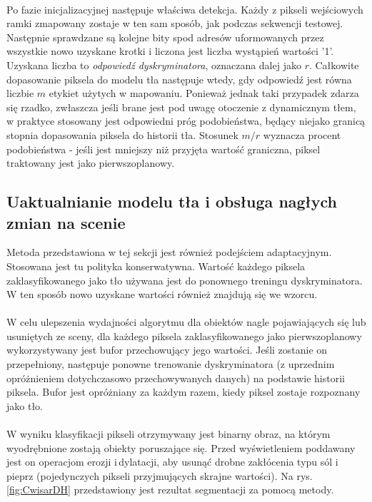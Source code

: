\paragraph{}
Po fazie inicjalizacyjnej następuje właściwa detekcja. Każdy z pikseli wejściowych ramki zmapowany zostaje w ten sam sposób, jak podczas sekwencji testowej. Następnie sprawdzane są kolejne bity spod adresów uformowanych przez wszystkie nowo uzyskane krotki i liczona jest liczba wystąpień wartości '1'. Uzyskana liczba to \textit{odpowiedź dyskryminatora}, oznaczana dalej jako $r$. Całkowite dopasowanie piksela do modelu tła następuje wtedy, gdy odpowiedź jest równa liczbie $m$ etykiet użytych w mapowaniu. Ponieważ jednak taki przypadek zdarza się rzadko, zwłaszcza jeśli brane jest pod uwagę otoczenie z dynamicznym tłem, w praktyce stosowany jest odpowiedni próg podobieństwa, będący niejako granicą stopnia dopasowania piksela do historii tła. Stosunek $m/r$ wyznacza procent podobieństwa - jeśli jest mniejszy niż przyjęta wartość graniczna, piksel traktowany jest jako pierwszoplanowy.
\subsection{Uaktualnianie modelu tła i obsługa nagłych zmian na scenie}
Metoda przedstawiona w tej sekcji jest również podejściem adaptacyjnym. Stosowana jest tu polityka konserwatywna. Wartość każdego piksela zaklasyfikowanego jako tło używana jest do ponownego treningu dyskryminatora. W ten sposób nowo uzyskane wartości również znajdują się we wzorcu.
\paragraph{}
W celu ulepszenia wydajności algorytmu dla obiektów nagle pojawiających się lub usuniętych ze sceny, dla każdego piksela zaklasyfikowanego jako pierwszoplanowy wykorzystywany jest bufor przechowujący jego wartości. Jeśli zostanie on przepełniony, następuje ponowne trenowanie dyskryminatora (z uprzednim opróżnieniem dotychczasowo przechowywanych danych) na podstawie historii piksela. Bufor jest opróżniany za każdym razem, kiedy piksel zostaje rozpoznany jako tło.
\paragraph{}
W wyniku klasyfikacji pikseli otrzymywany jest binarny obraz, na którym wyodrębnione zostają obiekty poruszające się. Przed wyświetleniem poddawany jest on operacjom erozji i\,dylatacji, aby usunąć drobne zakłócenia typu sól i pieprz (pojedynczych pikseli przyjmujących skrajne wartości). Na rys. \ref{fig:CwisarDH} przedstawiony jest rezultat segmentacji za pomocą metody. 


